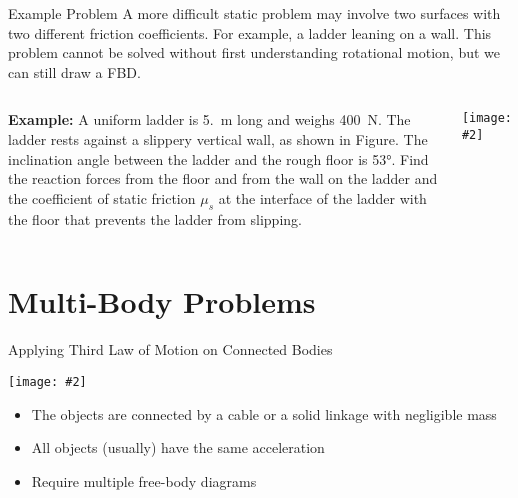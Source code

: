 \documentclass[12pt,compress,aspectratio=169]{beamer}
\newcommand{\pic}[2]{\texttt{[image: \#2]}}
\begin{document}
\begin{frame}{Example Problem}
  A more difficult static problem may involve two surfaces with two different
  friction coefficients. For example, a ladder leaning on a wall. This problem
  cannot be solved without first understanding rotational motion, but we can
  still draw a FBD.
  \vspace{.2in}
  \begin{columns}
    \textbf{Example:} A uniform ladder is \SI{5.}{\metre} long and weighs
    \SI{400}{\newton}. The ladder rests against a slippery vertical wall, as
    shown in Figure. The inclination angle between the ladder and the rough
    floor is \ang{53}. Find the reaction forces from the floor and
    from the wall on the ladder and the coefficient of static friction $\mu_s$
    at the interface of the ladder with the floor that prevents the ladder from
    slipping.

    \pic{1}{graphics/ladder}
  \end{columns}
\end{frame}



\section{Multi-Body Problems}

\begin{frame}{Applying Third Law of Motion on Connected Bodies}
  \begin{center}
    \pic{.7}{graphics/worldslongestroadtrainwithpowertrailer8.jpg}
  \end{center}
  \begin{itemize}
  \item The objects are connected by a cable or a solid linkage with negligible
    mass
  \item All objects (usually) have the same acceleration
  \item Require multiple free-body diagrams
  \end{itemize}
\end{frame}
\end{document}
